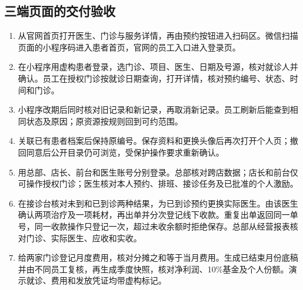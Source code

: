 \documentclass[UTF8,12pt,a4paper,fontset=none]{ctexart}
\begin{document}
\subsection{三端页面的交付验收}
\begin{enumerate}
\item 从官网首页打开医生、门诊与服务详情，再由预约按钮进入扫码区。微信扫描页面的小程序码进入患者首页，官网的员工入口进入登录页。
\item 在小程序用虚构患者登录，选门诊、项目、医生、日期及号源，核对就诊人并确认。员工在授权门诊按就诊日期查询，打开详情，核对预约编号、状态、时间和门诊。
\item 小程序改期后同时核对旧记录和新记录，再取消新记录。员工刷新后能查到相同状态及原因；原资源按规则回到可约范围。
\item 关联已有患者档案后保持原编号。保存资料和更换头像后再次打开个人页；撤回同意后公开目录仍可浏览，受保护操作要求重新确认。
\item 用总部、店长、前台和医生账号分别登录。总部核对跨店数据；店长和前台仅可操作授权门诊；医生核对本人预约、排班、接诊任务及已批准的个人激励。
\item 在接诊台核对未到和已到诊两种结果，为已到诊预约更换实际医生。由该医生确认两项治疗及一项耗材，再出单并分次登记线下收款。重复出单返回同一单号，同一收款操作只登记一次，超过未收余额时拒绝保存。总部从经营报表核对门诊、实际医生、应收和实收。
\item 给两家门诊登记月度费用，核对分摊之和等于当月费用。生成已结束月份底稿并由不同员工复核，再生成季度快照，核对净利润、10\%基金及个人份额。演示就诊、费用和发放凭证均带虚构标记。
\end{enumerate}
\end{document}
